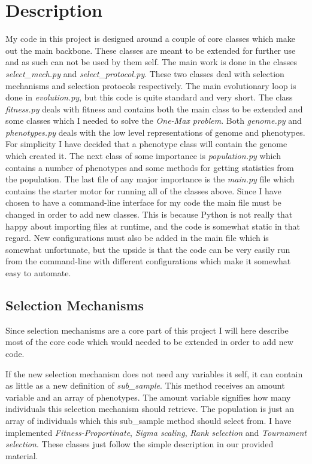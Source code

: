 \section{Description}\label{sec:description}
My code in this project is designed around a couple of core classes which make
out the main backbone. These classes are meant to be extended for further use
and as such can not be used by them self. The main work is done in the classes
\textit{select\_mech.py} and \textit{select\_protocol.py}. These two classes deal with
selection mechanisms and selection protocols respectively. The main evolutionary
loop is done in \textit{evolution.py}, but this code is quite standard and very short.
The class \textit{fitness.py} deals with fitness and contains both the main class to be
extended and some classes which I needed to solve the \textit{One-Max problem}.
Both \textit{genome.py} and \textit{phenotypes.py} deals with the low level
representations of genome and phenotypes. For simplicity I have decided that a
phenotype class will contain the genome which created it. The next class of some
importance is \textit{population.py} which contains a number of phenotypes and
some methods for getting statistics from the population. The last file of any
major importance is the \textit{main.py} file which contains the starter motor
for running all of the classes above. Since I have chosen to have a command-line
interface for my code the main file must be changed in order to add new classes.
This is because Python is not really that happy about importing files at
runtime, and the code is somewhat static in that regard. New configurations must
also be added in the main file which is somewhat unfortunate, but the upside is
that the code can be very easily run from the command-line with different
configurations which make it somewhat easy to automate.

\subsection{Selection Mechanisms}\label{sec:selection mechanisms}
Since selection mechanisms are a core part of this project I will here describe
most of the core code which would needed to be extended in order to add new
code.

If the new selection mechanism does not need any variables it self, it can
contain as little as a new definition of \textit{sub\_sample}. This method
receives an amount variable and an array of phenotypes. The amount variable
signifies how many individuals this selection mechanism should retrieve. The
population is just an array of individuals which this sub\_sample method should
select from. I have implemented \textit{Fitness-Proportinate}, \textit{Sigma
scaling}, \textit{Rank selection} and \textit{Tournament selection}. These
classes just follow the simple description in our provided material.

